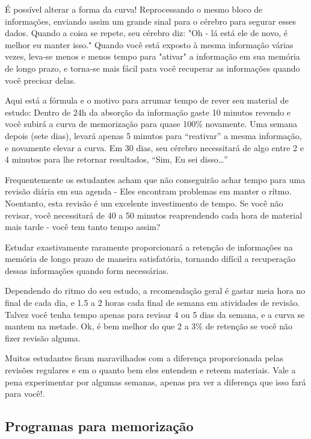 É possível alterar a forma da curva! Reprocessando o mesmo bloco de
informações, enviando assim um grande sinal para o cérebro para
segurar esses dados. Quando a coisa se repete, seu cérebro diz: "Oh -
lá está ele de novo, é melhor eu manter isso." Quando você está
exposto à mesma informação várias vezes, leva-se menos e menos tempo
para "ativar" a informação em sua memória de longo prazo, e torna-se
mais fácil para você recuperar as informações quando você precisar
delas.

Aqui está a fórmula e o motivo para arrumar tempo de rever seu
material de estudo: Dentro de 24h da absorção da informação gaste 10
minutos revendo e você subirá a curva de memorização para quase 100\%
novamente. Uma semana depois (sete dias), levará apenas 5 minutos para
``reativar'' a mesma informação, e novamente elevar a curva. Em 30 dias,
seu cérebro necessitará de algo entre 2 e 4 minutos para lhe retornar
resultados, ``Sim, Eu sei disso\dots''

Frequentemente os estudantes acham que não conseguirão achar tempo para uma
revisão diária em sua agenda - Eles encontram problemas em manter o
rítmo. Noentanto, esta revisão é um excelente investimento de tempo.
Se você não revisar, você necessitará de 40 a 50 minutos reaprendendo
cada hora de material mais tarde - você tem tanto tempo assim?

Estudar exastivamente raramente proporcionará a retenção de
informações na memória de longo prazo de maneira satisfatória,
tornando difícil a recuperação dessas informações quando form
necessárias.

Dependendo do ritmo do seu estudo, a recomendação geral é gastar
meia hora no final de cada dia, e 1.5 a 2 horas cada final de semana
em atividades de revisão. Talvez você tenha tempo apenas para revisar
4 ou 5 dias da semana, e a curva se mantem na metade. Ok, é bem melhor
do que 2 a 3\% de retenção se você não fizer revisão alguma.

Muitos estudantes ficam maravilhados com a diferença proporcionada pelas
revisões regulares e em o quanto bem eles entendem e reteem materiais.
Vale a pena experimentar por algumas semanas, apenas pra ver a diferença
que isso fará para você!.


\subsection{Programas para memorização}
\label{sub:programas_para_memoria_o}

